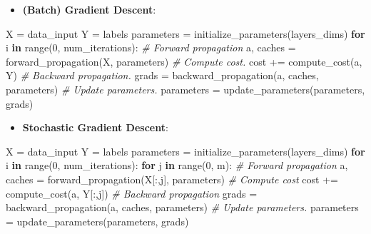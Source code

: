 \documentclass[11pt]{article}
\providecommand{\tightlist}{%
      \setlength{\itemsep}{0pt}\setlength{\parskip}{0pt}}
\newenvironment{Shaded}{}{}
\newcommand{\KeywordTok}[1]{\textcolor[rgb]{0.00,0.44,0.13}{\textbf{{#1}}}}
\newcommand{\DecValTok}[1]{\textcolor[rgb]{0.25,0.63,0.44}{{#1}}}
\newcommand{\CommentTok}[1]{\textcolor[rgb]{0.38,0.63,0.69}{\textit{{#1}}}}
\newcommand{\NormalTok}[1]{{#1}}
\newcommand{\ControlFlowTok}[1]{\textcolor[rgb]{0.00,0.44,0.13}{\textbf{{#1}}}}
\newcommand{\OperatorTok}[1]{\textcolor[rgb]{0.40,0.40,0.40}{{#1}}}
\newcommand{\BuiltInTok}[1]{{#1}}
\begin{document}
\begin{itemize}
\tightlist
\item
  \textbf{(Batch) Gradient Descent}:
\end{itemize}

\begin{Shaded}
\begin{Highlighting}[]
\NormalTok{X }\OperatorTok{=}\NormalTok{ data\_input}
\NormalTok{Y }\OperatorTok{=}\NormalTok{ labels}
\NormalTok{parameters }\OperatorTok{=}\NormalTok{ initialize\_parameters(layers\_dims)}
\ControlFlowTok{for}\NormalTok{ i }\KeywordTok{in} \BuiltInTok{range}\NormalTok{(}\DecValTok{0}\NormalTok{, num\_iterations):}
    \CommentTok{\# Forward propagation}
\NormalTok{    a, caches }\OperatorTok{=}\NormalTok{ forward\_propagation(X, parameters)}
    \CommentTok{\# Compute cost.}
\NormalTok{    cost }\OperatorTok{+=}\NormalTok{ compute\_cost(a, Y)}
    \CommentTok{\# Backward propagation.}
\NormalTok{    grads }\OperatorTok{=}\NormalTok{ backward\_propagation(a, caches, parameters)}
    \CommentTok{\# Update parameters.}
\NormalTok{    parameters }\OperatorTok{=}\NormalTok{ update\_parameters(parameters, grads)}
        
\end{Highlighting}
\end{Shaded}

\begin{itemize}
\tightlist
\item
  \textbf{Stochastic Gradient Descent}:
\end{itemize}

\begin{Shaded}
\begin{Highlighting}[]
\NormalTok{X }\OperatorTok{=}\NormalTok{ data\_input}
\NormalTok{Y }\OperatorTok{=}\NormalTok{ labels}
\NormalTok{parameters }\OperatorTok{=}\NormalTok{ initialize\_parameters(layers\_dims)}
\ControlFlowTok{for}\NormalTok{ i }\KeywordTok{in} \BuiltInTok{range}\NormalTok{(}\DecValTok{0}\NormalTok{, num\_iterations):}
    \ControlFlowTok{for}\NormalTok{ j }\KeywordTok{in} \BuiltInTok{range}\NormalTok{(}\DecValTok{0}\NormalTok{, m):}
        \CommentTok{\# Forward propagation}
\NormalTok{        a, caches }\OperatorTok{=}\NormalTok{ forward\_propagation(X[:,j], parameters)}
        \CommentTok{\# Compute cost}
\NormalTok{        cost }\OperatorTok{+=}\NormalTok{ compute\_cost(a, Y[:,j])}
        \CommentTok{\# Backward propagation}
\NormalTok{        grads }\OperatorTok{=}\NormalTok{ backward\_propagation(a, caches, parameters)}
        \CommentTok{\# Update parameters.}
\NormalTok{        parameters }\OperatorTok{=}\NormalTok{ update\_parameters(parameters, grads)}
\end{Highlighting}
\end{Shaded}
\end{document}
